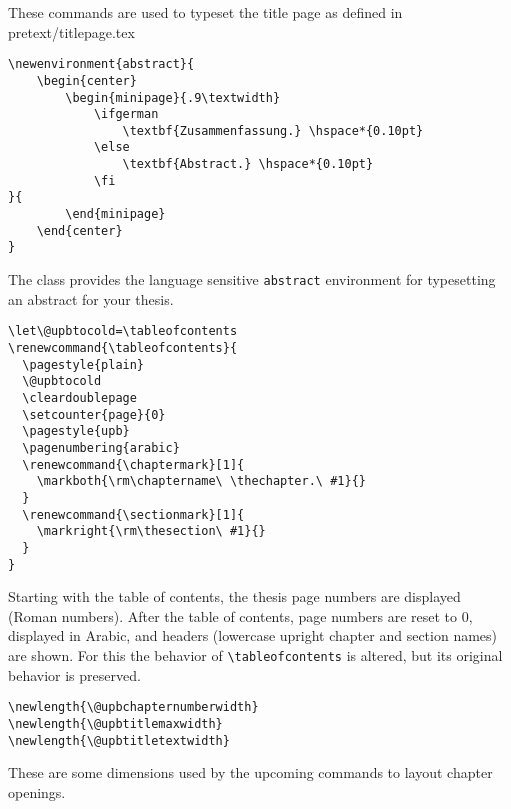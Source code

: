 These commands are used to typeset the title page as defined in
\mbox{pretext/titlepage.tex}



\begin{verbatim}
\newenvironment{abstract}{
    \begin{center}
        \begin{minipage}{.9\textwidth}
            \ifgerman
                \textbf{Zusammenfassung.} \hspace*{0.10pt}
            \else
                \textbf{Abstract.} \hspace*{0.10pt}
            \fi
}{
        \end{minipage}
    \end{center}
}
\end{verbatim}

\vspace*{-6pt} \noindent
The class provides the language sensitive \verb+abstract+ environment for
typesetting an abstract for your thesis.



\begin{verbatim}
\let\@upbtocold=\tableofcontents
\renewcommand{\tableofcontents}{
  \pagestyle{plain}	
  \@upbtocold
  \cleardoublepage
  \setcounter{page}{0}
  \pagestyle{upb}
  \pagenumbering{arabic}
  \renewcommand{\chaptermark}[1]{
    \markboth{\rm\chaptername\ \thechapter.\ #1}{}
  }
  \renewcommand{\sectionmark}[1]{
    \markright{\rm\thesection\ #1}{}
  }
}
\end{verbatim}

\vspace*{-6pt} \noindent
Starting with the table of contents, the thesis page numbers are displayed
(Roman numbers).
After the table of contents, page numbers are reset to 0, displayed in Arabic, 
and headers (lowercase upright chapter and section names) are shown. 
For this the behavior of \verb+\tableofcontents+ is altered, but its original
behavior is preserved.



\begin{verbatim}
\newlength{\@upbchapternumberwidth}
\newlength{\@upbtitlemaxwidth}
\newlength{\@upbtitletextwidth}
\end{verbatim}

\vspace*{-6pt} \noindent
These are some dimensions used by the upcoming commands to layout chapter
openings.



